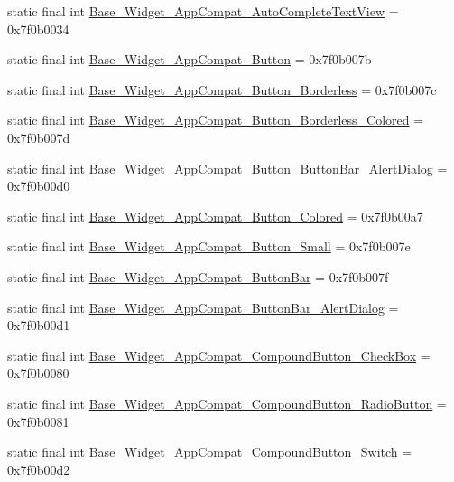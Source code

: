 \begin{CompactItemize}
static final int \hyperlink{classandroid_1_1support_1_1v7_1_1mediarouter_1_1_r_1_1style_9f3c8e8359ef8214b8a59a323371718d}{Base\_\-Widget\_\-AppCompat\_\-AutoCompleteTextView} = 0x7f0b0034
\item 
static final int \hyperlink{classandroid_1_1support_1_1v7_1_1mediarouter_1_1_r_1_1style_e94901ec2e088492f4932bd3506b957f}{Base\_\-Widget\_\-AppCompat\_\-Button} = 0x7f0b007b
\item 
static final int \hyperlink{classandroid_1_1support_1_1v7_1_1mediarouter_1_1_r_1_1style_54c25c9792775b030929d2ba8a9c3f44}{Base\_\-Widget\_\-AppCompat\_\-Button\_\-Borderless} = 0x7f0b007c
\item 
static final int \hyperlink{classandroid_1_1support_1_1v7_1_1mediarouter_1_1_r_1_1style_ab3ee08fcae3363341f2e2c0ad9e4833}{Base\_\-Widget\_\-AppCompat\_\-Button\_\-Borderless\_\-Colored} = 0x7f0b007d
\item 
static final int \hyperlink{classandroid_1_1support_1_1v7_1_1mediarouter_1_1_r_1_1style_a33aa76b851ac9ee4bd93aa982091b37}{Base\_\-Widget\_\-AppCompat\_\-Button\_\-ButtonBar\_\-AlertDialog} = 0x7f0b00d0
\item 
static final int \hyperlink{classandroid_1_1support_1_1v7_1_1mediarouter_1_1_r_1_1style_35aaba0b48b833bad1f0bc7205fc4d86}{Base\_\-Widget\_\-AppCompat\_\-Button\_\-Colored} = 0x7f0b00a7
\item 
static final int \hyperlink{classandroid_1_1support_1_1v7_1_1mediarouter_1_1_r_1_1style_9684b80beded26509e11a0279964e068}{Base\_\-Widget\_\-AppCompat\_\-Button\_\-Small} = 0x7f0b007e
\item 
static final int \hyperlink{classandroid_1_1support_1_1v7_1_1mediarouter_1_1_r_1_1style_3461369824dd3e05dc09f912b5156e48}{Base\_\-Widget\_\-AppCompat\_\-ButtonBar} = 0x7f0b007f
\item 
static final int \hyperlink{classandroid_1_1support_1_1v7_1_1mediarouter_1_1_r_1_1style_128cd03e7478ef3cbdafceab9c44d82d}{Base\_\-Widget\_\-AppCompat\_\-ButtonBar\_\-AlertDialog} = 0x7f0b00d1
\item 
static final int \hyperlink{classandroid_1_1support_1_1v7_1_1mediarouter_1_1_r_1_1style_cb9858a0d6db6288033b5007cf9a1dd9}{Base\_\-Widget\_\-AppCompat\_\-CompoundButton\_\-CheckBox} = 0x7f0b0080
\item 
static final int \hyperlink{classandroid_1_1support_1_1v7_1_1mediarouter_1_1_r_1_1style_da1438a52380415ab4964fce1c5f4fa2}{Base\_\-Widget\_\-AppCompat\_\-CompoundButton\_\-RadioButton} = 0x7f0b0081
\item 
static final int \hyperlink{classandroid_1_1support_1_1v7_1_1mediarouter_1_1_r_1_1style_c34b7bb8f58658c98354837629a3381d}{Base\_\-Widget\_\-AppCompat\_\-CompoundButton\_\-Switch} = 0x7f0b00d2

\end{CompactItemize}
